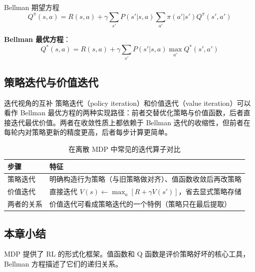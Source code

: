 \begin{importantbox}{Bellman 期望方程}
$$Q^\pi(s, a) = R(s, a) + \gamma \sum_{s'} P(s'|s,a) \sum_{a'} \pi(a'|s') Q^\pi(s', a')$$

\textbf{Bellman 最优方程}：
$$Q^*(s, a) = R(s, a) + \gamma \sum_{s'} P(s'|s,a) \max_{a'} Q^*(s', a')$$
\end{importantbox}

\subsection{策略迭代与价值迭代}

\begin{knowledgebox}{迭代视角的互补}
策略迭代（policy iteration）和价值迭代（value iteration）可以看作 Bellman 最优方程的两种实现路径：前者交替优化策略与价值函数，后者直接迭代最优价值。两者在收敛性质上都依赖于 Bellman 迭代的收缩性，但前者在每轮内对策略更新的精度更高，后者每步计算更简单。
\end{knowledgebox}

\begin{table}[H]
\centering
\begin{tabular}{ll}
\toprule
步骤 & 特征 \\
\midrule
策略迭代 & 明确构造行为策略（与旧策略做对齐）、值函数收敛后再改策略 \\
价值迭代 & 直接迭代 $V(s) \leftarrow \max_a [R+\gamma V(s')]$，省去显式策略存储 \\
两者的关系 & 价值迭代可看成策略迭代的一个特例（策略只在最后提取） \\
\bottomrule
\end{tabular}
\caption{在离散 MDP 中常见的迭代算子对比}
\label{tab:mdp-iteration}
\end{table}

\subsection{本章小结}

MDP 提供了 RL 的形式化框架。值函数和 Q 函数是评价策略好坏的核心工具，Bellman 方程描述了它们的递归关系。

